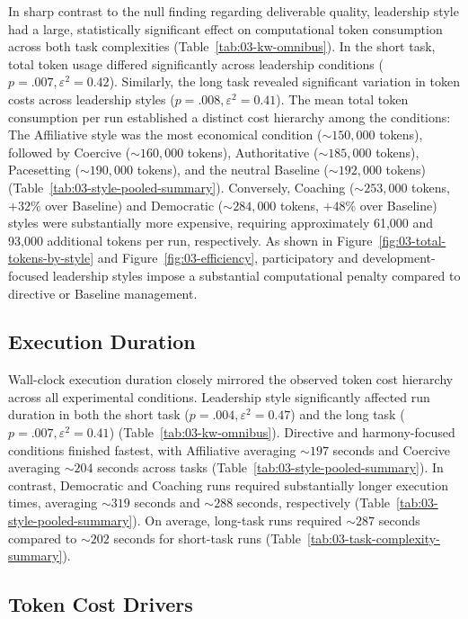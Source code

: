 In sharp contrast to the null finding regarding deliverable quality, leadership style had a large, statistically significant effect on computational token consumption across both task complexities (Table~\ref{tab:03-kw-omnibus}).
In the short task, total token usage differed significantly across leadership conditions ($p = .007, \varepsilon^2 = 0.42$).
Similarly, the long task revealed significant variation in token costs across leadership styles ($p = .008, \varepsilon^2 = 0.41$).
The mean total token consumption per run established a distinct cost hierarchy among the conditions:
The Affiliative style was the most economical condition ($\sim150{,}000$ tokens), followed by Coercive ($\sim160{,}000$ tokens), Authoritative ($\sim185{,}000$ tokens), Pacesetting ($\sim190{,}000$ tokens), and the neutral Baseline ($\sim192{,}000$ tokens) (Table~\ref{tab:03-style-pooled-summary}).
Conversely, Coaching ($\sim253{,}000$ tokens, $+32\%$ over Baseline) and Democratic ($\sim284{,}000$ tokens, $+48\%$ over Baseline) styles were substantially more expensive, requiring approximately 61,000 and 93,000 additional tokens per run, respectively.
As shown in Figure~\ref{fig:03-total-tokens-by-style} and Figure~\ref{fig:03-efficiency}, participatory and development-focused leadership styles impose a substantial computational penalty compared to directive or Baseline management.

\subsection{Execution Duration}
\label{subsec:execution-duration}

Wall-clock execution duration closely mirrored the observed token cost hierarchy across all experimental conditions.
Leadership style significantly affected run duration in both the short task ($p = .004, \varepsilon^2 = 0.47$) and the long task ($p = .007, \varepsilon^2 = 0.41$) (Table~\ref{tab:03-kw-omnibus}).
Directive and harmony-focused conditions finished fastest, with Affiliative averaging $\sim197$ seconds and Coercive averaging $\sim204$ seconds across tasks (Table~\ref{tab:03-style-pooled-summary}).
In contrast, Democratic and Coaching runs required substantially longer execution times, averaging $\sim319$ seconds and $\sim288$ seconds, respectively (Table~\ref{tab:03-style-pooled-summary}).
On average, long-task runs required $\sim287$ seconds compared to $\sim202$ seconds for short-task runs (Table~\ref{tab:03-task-complexity-summary}).

\subsection{Token Cost Drivers}
\label{subsec:token-cost-drivers}

